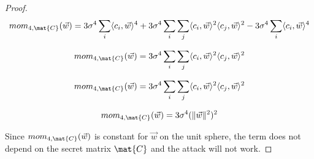 \begin{proof}
    \[
        mom_{4, \mat{C}}(\vec{w}) = 3 \sigma ^4 \sum_i \langle c_i, \vec{w} \rangle ^4 
        + 3\sigma^4 \sum_{i} \sum_{j} \langle c_i, \vec{w} \rangle ^2 \langle c_j, \vec{w} \rangle ^2
        - 3\sigma^4 \sum_{i} \langle c_i, \vec{w} \rangle ^4
    \]

    \[
        mom_{4, \mat{C}}(\vec{w}) = 3\sigma^4 \sum_{i} \sum_{j} \langle c_i, \vec{w} \rangle ^2 \langle c_j, \vec{w} \rangle ^2
    \]

    \[
        mom_{4, \mat{C}}(\vec{w}) = 3\sigma^4 \sum_{i} \sum_{j} \langle c_i, \vec{w} \rangle ^2 \langle c_j, \vec{w} \rangle ^2
    \]

    \[
        mom_{4, \mat{C}}(\vec{w}) = 3\sigma^4 (\lVert \vec{w} \rVert ^2 ) ^2
    \]

    Since $mom_{4, \mat{C}}(\vec{w})$ is constant for $\vec{w}$ on the unit sphere, the term does not depend on the secret matrix $\mat{C}$ and the attack will not work.
\end{proof}
